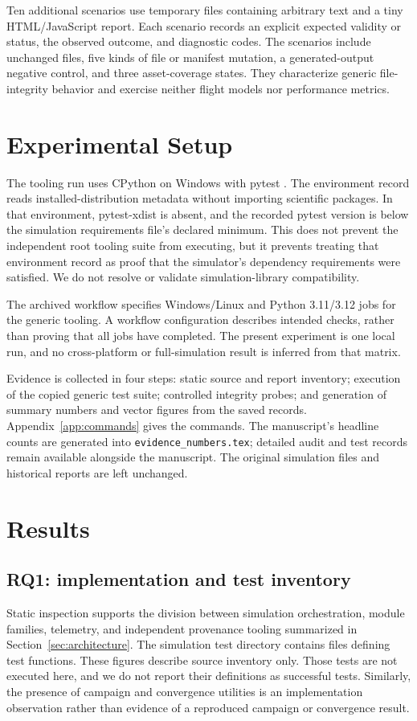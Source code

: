 \documentclass[11pt,a4paper]{article}
\newcommand{\code}[1]{\texttt{#1}}
\begin{document}
Ten additional scenarios use temporary files containing arbitrary text and a tiny HTML/JavaScript report. Each scenario records an explicit expected validity or status, the observed outcome, and diagnostic codes. The scenarios include unchanged files, five kinds of file or manifest mutation, a generated-output negative control, and three asset-coverage states. They characterize generic file-integrity behavior and exercise neither flight models nor performance metrics.

\section{Experimental Setup}
\label{sec:setup}
The tooling run uses CPython \AuditPython on Windows with pytest \AuditPytest. The environment record reads installed-distribution metadata without importing scientific packages. In that environment, pytest-xdist is absent, and the recorded pytest version is below the simulation requirements file's declared minimum. This does not prevent the independent root tooling suite from executing, but it prevents treating that environment record as proof that the simulator's dependency requirements were satisfied. We do not resolve or validate simulation-library compatibility.

The archived workflow specifies Windows/Linux and Python 3.11/3.12 jobs for the generic tooling. A workflow configuration describes intended checks, rather than proving that all jobs have completed. The present experiment is one local run, and no cross-platform or full-simulation result is inferred from that matrix.

Evidence is collected in four steps: static source and report inventory; execution of the copied generic test suite; controlled integrity probes; and generation of summary numbers and vector figures from the saved records. Appendix~\ref{app:commands} gives the commands. The manuscript's headline counts are generated into \code{evidence\_numbers.tex}; detailed audit and test records remain available alongside the manuscript. The original simulation files and historical reports are left unchanged.

\section{Results}
\label{sec:results}
\subsection{RQ1: implementation and test inventory}
Static inspection supports the division between simulation orchestration, module families, telemetry, and independent provenance tooling summarized in Section~\ref{sec:architecture}. The simulation test directory contains \SimulationTestFiles files defining \SimulationTestDefinitions test functions. These figures describe source inventory only. Those tests are not executed here, and we do not report their definitions as successful tests. Similarly, the presence of campaign and convergence utilities is an implementation observation rather than evidence of a reproduced campaign or convergence result.
\end{document}
